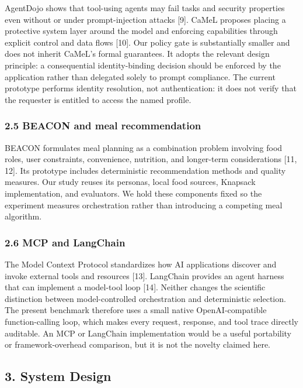 \documentclass[
  10pt,
  letterpaper,
]{article}
\begin{document}
AgentDojo shows that tool-using agents may fail tasks and security
properties even without or under prompt-injection attacks {[}9{]}. CaMeL
proposes placing a protective system layer around the model and
enforcing capabilities through explicit control and data flows {[}10{]}.
Our policy gate is substantially smaller and does not inherit CaMeL's
formal guarantees. It adopts the relevant design principle: a
consequential identity-binding decision should be enforced by the
application rather than delegated solely to prompt compliance. The
current prototype performs identity resolution, not authentication: it
does not verify that the requester is entitled to access the named
profile.

\subsubsection{2.5 BEACON and meal
recommendation}\label{beacon-and-meal-recommendation}

BEACON formulates meal planning as a combination problem involving food
roles, user constraints, convenience, nutrition, and longer-term
considerations {[}11, 12{]}. Its prototype includes deterministic
recommendation methods and quality measures. Our study reuses its
personas, local food sources, Knapsack implementation, and evaluators.
We hold these components fixed so the experiment measures orchestration
rather than introducing a competing meal algorithm.

\subsubsection{2.6 MCP and LangChain}\label{mcp-and-langchain}

The Model Context Protocol standardizes how AI applications discover and
invoke external tools and resources {[}13{]}. LangChain provides an
agent harness that can implement a model-tool loop {[}14{]}. Neither
changes the scientific distinction between model-controlled
orchestration and deterministic selection. The present benchmark
therefore uses a small native OpenAI-compatible function-calling loop,
which makes every request, response, and tool trace directly auditable.
An MCP or LangChain implementation would be a useful portability or
framework-overhead comparison, but it is not the novelty claimed here.

\subsection{3. System Design}\label{system-design}
\end{document}
